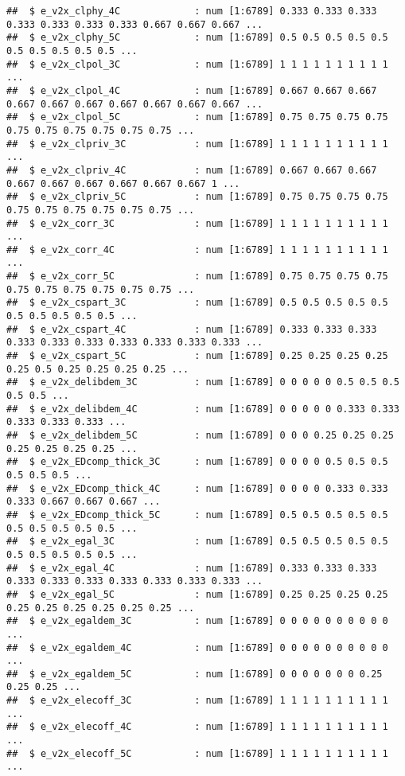 \documentclass[
]{article}
\begin{document}
\begin{verbatim}
##  $ e_v2x_clphy_4C             : num [1:6789] 0.333 0.333 0.333 0.333 0.333 0.333 0.333 0.667 0.667 0.667 ...
##  $ e_v2x_clphy_5C             : num [1:6789] 0.5 0.5 0.5 0.5 0.5 0.5 0.5 0.5 0.5 0.5 ...
##  $ e_v2x_clpol_3C             : num [1:6789] 1 1 1 1 1 1 1 1 1 1 ...
##  $ e_v2x_clpol_4C             : num [1:6789] 0.667 0.667 0.667 0.667 0.667 0.667 0.667 0.667 0.667 0.667 ...
##  $ e_v2x_clpol_5C             : num [1:6789] 0.75 0.75 0.75 0.75 0.75 0.75 0.75 0.75 0.75 0.75 ...
##  $ e_v2x_clpriv_3C            : num [1:6789] 1 1 1 1 1 1 1 1 1 1 ...
##  $ e_v2x_clpriv_4C            : num [1:6789] 0.667 0.667 0.667 0.667 0.667 0.667 0.667 0.667 0.667 1 ...
##  $ e_v2x_clpriv_5C            : num [1:6789] 0.75 0.75 0.75 0.75 0.75 0.75 0.75 0.75 0.75 0.75 ...
##  $ e_v2x_corr_3C              : num [1:6789] 1 1 1 1 1 1 1 1 1 1 ...
##  $ e_v2x_corr_4C              : num [1:6789] 1 1 1 1 1 1 1 1 1 1 ...
##  $ e_v2x_corr_5C              : num [1:6789] 0.75 0.75 0.75 0.75 0.75 0.75 0.75 0.75 0.75 0.75 ...
##  $ e_v2x_cspart_3C            : num [1:6789] 0.5 0.5 0.5 0.5 0.5 0.5 0.5 0.5 0.5 0.5 ...
##  $ e_v2x_cspart_4C            : num [1:6789] 0.333 0.333 0.333 0.333 0.333 0.333 0.333 0.333 0.333 0.333 ...
##  $ e_v2x_cspart_5C            : num [1:6789] 0.25 0.25 0.25 0.25 0.25 0.5 0.25 0.25 0.25 0.25 ...
##  $ e_v2x_delibdem_3C          : num [1:6789] 0 0 0 0 0 0.5 0.5 0.5 0.5 0.5 ...
##  $ e_v2x_delibdem_4C          : num [1:6789] 0 0 0 0 0 0.333 0.333 0.333 0.333 0.333 ...
##  $ e_v2x_delibdem_5C          : num [1:6789] 0 0 0 0.25 0.25 0.25 0.25 0.25 0.25 0.25 ...
##  $ e_v2x_EDcomp_thick_3C      : num [1:6789] 0 0 0 0 0.5 0.5 0.5 0.5 0.5 0.5 ...
##  $ e_v2x_EDcomp_thick_4C      : num [1:6789] 0 0 0 0 0.333 0.333 0.333 0.667 0.667 0.667 ...
##  $ e_v2x_EDcomp_thick_5C      : num [1:6789] 0.5 0.5 0.5 0.5 0.5 0.5 0.5 0.5 0.5 0.5 ...
##  $ e_v2x_egal_3C              : num [1:6789] 0.5 0.5 0.5 0.5 0.5 0.5 0.5 0.5 0.5 0.5 ...
##  $ e_v2x_egal_4C              : num [1:6789] 0.333 0.333 0.333 0.333 0.333 0.333 0.333 0.333 0.333 0.333 ...
##  $ e_v2x_egal_5C              : num [1:6789] 0.25 0.25 0.25 0.25 0.25 0.25 0.25 0.25 0.25 0.25 ...
##  $ e_v2x_egaldem_3C           : num [1:6789] 0 0 0 0 0 0 0 0 0 0 ...
##  $ e_v2x_egaldem_4C           : num [1:6789] 0 0 0 0 0 0 0 0 0 0 ...
##  $ e_v2x_egaldem_5C           : num [1:6789] 0 0 0 0 0 0 0 0.25 0.25 0.25 ...
##  $ e_v2x_elecoff_3C           : num [1:6789] 1 1 1 1 1 1 1 1 1 1 ...
##  $ e_v2x_elecoff_4C           : num [1:6789] 1 1 1 1 1 1 1 1 1 1 ...
##  $ e_v2x_elecoff_5C           : num [1:6789] 1 1 1 1 1 1 1 1 1 1 ...

\end{verbatim}
\end{document}
